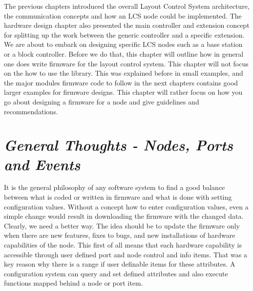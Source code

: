 
The previous chapters introduced the overall Layout Control System architecture, the communication concepts and how an LCS node could be implemented. The hardware design chapter also presented the main controller and extension concept for splitting up the work between the generic controller and a specific extension. We are about to embark on designing specific LCS nodes such as a base station or a block controller. Before we do that, this chapter will outline how in general one does write firmware for the layout control system. This chapter will not focus on the how to use the library. This was explained before in small examples, and the major modules firmware code to follow in the next chapters contains good larger examples for firmware designs. This chapter will rather focus on how you go about designing a firmware for a node and give guidelines and recommendations.

\section{\textit{General Thoughts - Nodes, Ports and Events}}

It is the general philosophy of any software system to find a good balance between what is coded or written in firmware and what is done with setting configuration values. Without a concept how to enter configuration values, even a simple change would result in downloading the firmware with the changed data. Clearly, we need a better way. The idea should be to update the firmware only when there are new features, fixes to bugs, and new installations of hardware capabilities of the node. This first of all means that each hardware capability is accessible through user defined port and node control and info items. That was a key reason why there is a range if user definable items for these attributes. A configuration system can query and set defined attributes and also execute functions mapped behind a node or port item.

